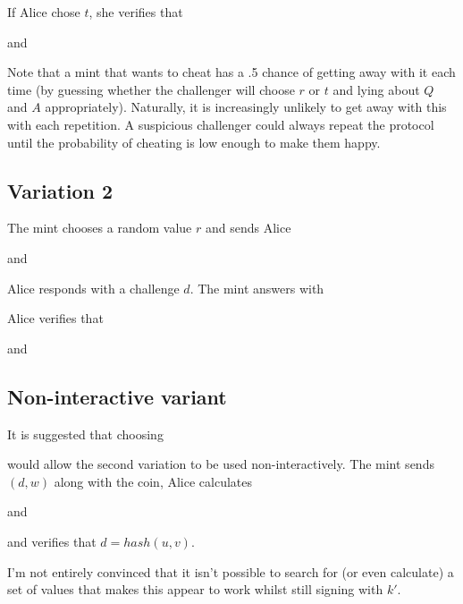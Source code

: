 \documentclass[a4paper,titlepage]{article}
\begin{document}

If Alice chose $t$, she verifies that


and


Note that a mint that wants to cheat has a .5 chance of getting away
with it each time (by guessing whether the challenger will choose $r$
or $t$ and lying about $Q$ and $A$ appropriately). Naturally, it is
increasingly unlikely to get away with this with each repetition. A
suspicious challenger could always repeat the protocol until the
probability of cheating is low enough to make them happy.

\subsection{Variation 2\cite{Chaum}}

The mint chooses a random value $r$ and sends Alice


and


Alice responds with a challenge $d$. The mint answers with


Alice verifies that


and


\subsection{Non-interactive variant}

It is suggested that choosing


would allow the second variation to be used non-interactively. The
mint sends $(d,w)$ along with the coin, Alice calculates


and


and verifies that $d=hash(u,v)$.

I'm not entirely convinced that it isn't possible to search for (or
even calculate) a set of values that makes this appear to work whilst
still signing with $k'$.
\end{document}
